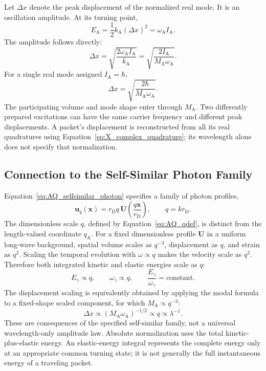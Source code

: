 Let $\Delta x$ denote the peak displacement of the normalized real mode. It is an oscillation amplitude. At its turning point,
\begin{equation}
    E_{\mathrm A}
    =\frac12k_{\mathrm A}(\Delta x)^2
    =\omega_{\mathrm A}I_{\mathrm A}.
\end{equation}
The amplitude follows directly:
\begin{equation}
    \boxed{
    \Delta x
    =\sqrt{\frac{2\omega_{\mathrm A}I_{\mathrm A}}{k_{\mathrm A}}}
    =\sqrt{\frac{2I_{\mathrm A}}{M_{\mathrm A}\omega_{\mathrm A}}}
    }.
\end{equation}
For a single real mode assigned $I_{\mathrm A}=\hbar$,
\begin{equation}
    \Delta x=\sqrt{\frac{2\hbar}{M_{\mathrm A}\omega_{\mathrm A}}}.
\end{equation}
The participating volume and mode shape enter through $M_{\mathrm A}$. Two differently prepared excitations can have the same carrier frequency and different peak displacements. A packet's displacement is reconstructed from all its real quadratures using Equation~\eqref{eq:X_complex_quadrature}; its wavelength alone does not specify that normalization.

\subsection{Connection to the Self-Similar Photon Family}

Equation~\eqref{eq:AQ_selfsimilar_photon} specifies a family of photon profiles,
\begin{equation}
    \mathbf u_q(\mathbf x)
    =r_{\mathrm D}q\,
    \mathbf U\!\left(\frac{q\mathbf x}{r_{\mathrm D}}\right),
    \qquad q=kr_{\mathrm D}.
\end{equation}
The dimensionless scale $q$, defined by Equation~\eqref{eq:AQ_qdef}, is distinct from the length-valued coordinate $q_{\mathrm A}$. For a fixed dimensionless profile $\mathbf U$ in a uniform long-wave background, spatial volume scales as $q^{-3}$, displacement as $q$, and strain as $q^2$. Scaling the temporal evolution with $\omega\propto q$ makes the velocity scale as $q^2$. Therefore both integrated kinetic and elastic energies scale as $q$:
\begin{equation}
    E_\gamma\propto q,
    \qquad \omega_\gamma\propto q,
    \qquad \frac{E_\gamma}{\omega_\gamma}=\text{constant}.
\end{equation}
The displacement scaling is equivalently obtained by applying the modal formula to a fixed-shape scaled component, for which $M_{\mathrm A}\propto q^{-3}$:
\begin{equation}
    \Delta x\propto(M_{\mathrm A}\omega_{\mathrm A})^{-1/2}
    \propto q\propto\lambda^{-1}.
\end{equation}
These are consequences of the specified self-similar family, not a universal wavelength-only amplitude law. Absolute normalization uses the total kinetic-plus-elastic energy. An elastic-energy integral represents the complete energy only at an appropriate common turning state; it is not generally the full instantaneous energy of a traveling packet.

